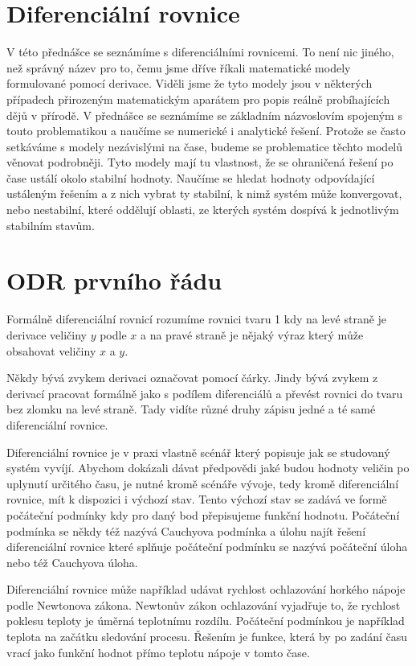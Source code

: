 \documentclass[12pt]{article}
\begin{document}
\section*{Diferenciální rovnice}

V této přednášce se seznámíme s diferenciálními rovnicemi. To není nic jiného, než správný název pro to, čemu jsme dříve říkali matematické modely formulované pomocí derivace. Viděli jsme že tyto modely jsou v některých případech přirozeným matematickým aparátem pro popis reálně probíhajících dějů v přírodě. V přednášce se seznámíme se základním názvoslovím spojeným s touto problematikou a naučíme se numerické i analytické řešení. Protože se často setkáváme s modely nezávislými na čase, budeme se problematice těchto modelů věnovat podrobněji. Tyto modely mají tu vlastnost, že se ohraničená řešení po čase ustálí okolo stabilní hodnoty. Naučíme se hledat hodnoty odpovídající ustáleným řešením a z nich vybrat ty stabilní, k nimž systém může konvergovat, nebo nestabilní, které oddělují oblasti, ze kterých systém dospívá k jednotlivým stabilním stavům.

\section*{ODR prvního řádu}

Formálně diferenciální rovnicí rozumíme rovnici tvaru 1 kdy na levé straně je derivace veličiny $y$ podle $x$ a na pravé straně je nějaký výraz který může obsahovat veličiny $x$ a $y$. 

Někdy bývá zvykem derivaci označovat pomocí čárky. Jindy bývá zvykem z derivací pracovat formálně jako s podílem diferenciálů a převést rovnici do tvaru bez zlomku na levé straně. Tady vidíte různé druhy zápisu jedné a té samé diferenciální rovnice.

Diferenciální rovnice je v praxi vlastně scénář který popisuje jak se
studovaný systém vyvíjí. Abychom dokázali dávat předpovědi jaké budou
hodnoty veličin po uplynutí určitého času, je nutné kromě scénáře
vývoje, tedy kromě diferenciální rovnice, mít k dispozici i výchozí
stav. Tento výchozí stav se zadává ve formě počáteční podmínky kdy pro
daný bod přepisujeme funkční hodnotu. Počáteční podmínka se někdy též
nazývá Cauchyova podmínka a úlohu najít řešení diferenciální rovnice
které splňuje počáteční podmínku se nazývá počáteční úloha nebo též
Cauchyova úloha.


Diferenciální rovnice může například udávat rychlost ochlazování horkého nápoje podle Newtonova zákona. Newtonův zákon ochlazování vyjadřuje to, že rychlost poklesu teploty je úměrná teplotnímu rozdílu. Počáteční podmínkou je například teplota na začátku sledování procesu. Řešením je funkce, která by po zadání času vrací jako funkční hodnot přímo teplotu nápoje v tomto čase. 
\end{document}
